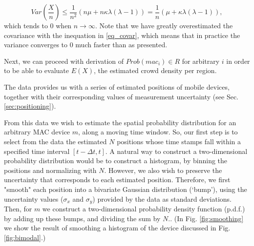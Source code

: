 \documentclass[10pt,a4paper]{article}
\begin{document}
\begin{equation}
Var(\frac{X}{n} ) \leq \frac{1}{n^2}(n \mu + n  \kappa \lambda(\lambda - 1)) = \frac{1}{n}(\mu +  \kappa \lambda(\lambda - 1)), 
\end{equation}
which tends to $0$ when $n \rightarrow \infty$. Note that we have greatly overestimated the covariance with the inequation in \eqref{eq_covar}, which means that in practice the variance converges to $0$ much faster than as presented. 

Next, we can proceed with derivation of $Prob(mac_i) \in R$ for arbitrary $i$ in order to be able to evaluate $E(X)$, the estimated crowd density per region. 
   

The data provides us with a series of estimated positions of mobile devices, together with their corresponding values of measurement uncertainty (see Sec.\ref{sec:positioning}).


From this data we wish to estimate the spatial probability distribution for an arbitrary MAC device $m$, along a moving time window.
So, our first step is to select from the data the estimated $N$ positions whose time stamps fall within a specified time interval $[t-\Delta t,t]$.
A natural way to construct a two-dimensional probability distribution would be to construct a histogram, by binning the positions and normalizing with $N$.
However, we also wish to preserve the uncertainty that corresponds to each estimated position.
Therefore, we first "smooth" each position into a bivariate Gaussian distribution (`bump'), using the uncertainty values ($\sigma_{x}$ and $\sigma_{y}$) provided by the data as standard deviations. Then, for  $m$ we construct a two-dimensional probability density function (p.d.f.) by adding up these bumps, and  dividing the sum by $N$.. (In Fig. \ref{fig:smoothing} we show the result of smoothing a histogram of the device discussed in Fig.\ref{fig:bimodal}.) %
\end{document}
